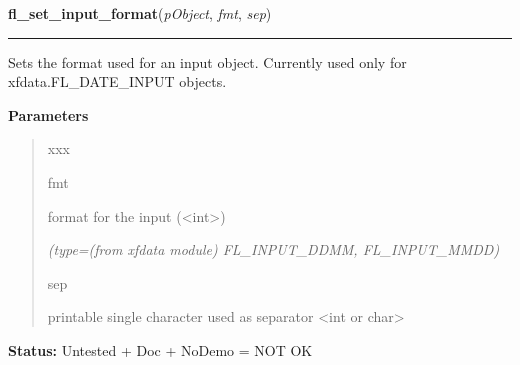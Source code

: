 \hspace{.8\funcindent}\begin{boxedminipage}{\funcwidth}

    \raggedright \textbf{fl\_set\_input\_format}(\textit{pObject}, \textit{fmt}, \textit{sep})

    \vspace{-1.5ex}

    \rule{\textwidth}{0.5\fboxrule}
\setlength{\parskip}{2ex}
    Sets the format used for an input object. Currently used only for 
    xfdata.FL\_DATE\_INPUT objects.

\setlength{\parskip}{1ex}
      \textbf{Parameters}
      \vspace{-1ex}

      \begin{quote}
        \begin{Ventry}{xxx}

          \item[fmt]

          format for the input ({\textless}int{\textgreater})

            {\it (type=(from xfdata module) FL\_INPUT\_DDMM, FL\_INPUT\_MMDD)}

          \item[sep]

          printable single character used as separator {\textless}int or 
          char{\textgreater}

        \end{Ventry}

      \end{quote}

\textbf{Status:} Untested + Doc + NoDemo = NOT OK



    \end{boxedminipage}

    \label{xformslib:library:fl_set_input_hscrollbar}

    \vspace{0.5ex}

